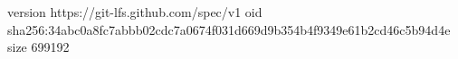 version https://git-lfs.github.com/spec/v1
oid sha256:34abc0a8fc7abbb02cdc7a0674f031d669d9b354b4f9349e61b2cd46c5b94d4e
size 699192
